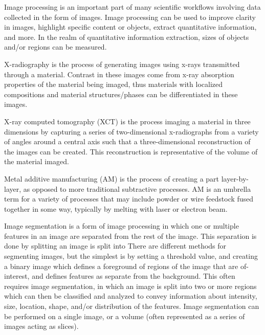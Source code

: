 Image processing is an important part of many scientific workflows
involving data collected in the form of images. Image processing can be
used to improve clarity in images, highlight specific content or objects,
extract quantitative information, and more. In the realm of quantitative
information extraction, sizes of objects and/or regions can be measured.

X-radiography is the process of generating images using x-rays transmitted
through a material. Contrast in these images come from x-ray absorption
properties of the material being imaged, thus materials with localized
compositions and material structures/phases can be differentiated in these
images.

X-ray computed tomography (XCT) is the process imaging a material in three
dimensions by capturing a series of two-dimensional x-radiographs from a
variety of angles around a central axis such that a three-dimensional
reconstruction of the images can be created. This reconstruction is
representative of the volume of the material imaged.

Metal additive manufacturing (AM) is the process of creating a part
layer-by-layer, as opposed to more traditional subtractive processes.
AM is an umbrella term for a variety of processes that may include powder
or wire feedstock fused together in some way, typically by melting with
laser or electron beam.

Image segmentation is a form of image processing in which one or multiple
features in an image are separated from the rest of the image. This separation is done by splitting an image is split into
There are different methods for segmenting images, but the simplest is
by setting a threshold value, and creating a binary image
which defines a foreground of regions of the image that are of-interest,
and defines features as separate from the background.
This often requires image segmentation, in which an image is split into
two or more regions which can then be classified and analyzed to convey
information about intensity, size, location, shape, and/or distribution
of the features. Image segmentation can be performed on a single image,
or a volume (often represented as a series of images acting as slices).

